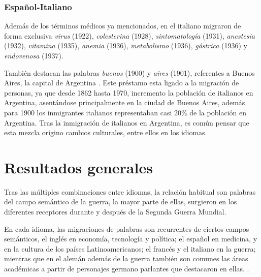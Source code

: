 \subsubsection*{Español-Italiano}%

Además de los términos médicos ya mencionados, en el italiano migraron de forma  exclusiva  \textit{virus} (1922), \textit{colesterina} (1928),  \textit{sintomatología} (1931), \textit{anestesia} (1932), \textit{vitamina} (1935), \textit{anemia} (1936), \textit{metabolismo} (1936),  \textit{gástrica} (1936)  y \textit{endovenosa} (1937).  

También destacan las palabras  \textit{buenos} (1900) y \textit{aires} (1901), referentes a Buenos Aires, la capital de Argentina . Este préstamo esta ligado a la migración de personas,  ya que desde 1862 hasta 1970, incremento la población de italianos en Argentina,  asentándose principalmente en la ciudad de Buenos Aires,  además para 1900 los inmigrantes italianos representaban casi 20$\%$ de la población en Argentina.  Tras la inmigración de italianos en Argentina, es común pensar que esta mezcla origino cambios culturales, entre ellos en los idiomas. 







\section{Resultados generales}%



Tras las múltiples combinaciones entre idiomas, la relación habitual son palabras del campo semántico de la guerra, la mayor parte de ellas, surgieron en los diferentes receptores durante y después de la Segunda Guerra Mundial. 

En cada idioma, las migraciones de palabras son recurrentes de ciertos campos semánticos,  el inglés en economía, tecnología y política; el español en medicina, y en la cultura de los países Latinoamericanos; el francés y el italiano en la guerra; mientras que en el alemán además de la guerra también son comunes las áreas académicas  a partir de personajes germano parlantes que destacaron en ellas. .  

